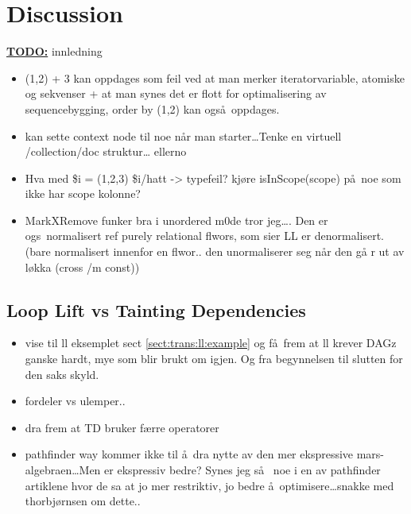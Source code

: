\chapter{Discussion}
\label{chapter:discussion}

\textbf{\underline{\LARGE TODO:}} innledning

\begin{itemize}
  \item (1,2) + 3 kan oppdages som feil ved at man merker iteratorvariable, atomiske og sekvenser + at man synes
  det er flott for optimalisering av sequencebygging, order by (1,2) kan ogs\aa~oppdages.
  \item kan sette context node til noe n\aa r man starter\ldots Tenke en virtuell /collection/doc struktur\ldots
  ellerno
	\item Hva med \$i = (1,2,3) \$i/hatt -> typefeil? kj\o re isInScope(scope) p\aa~noe som ikke har scope kolonne?
	\item MarkXRemove funker bra i unordered m0de tror jeg\ldots. Den er ogs\a~normalisert ref purely relational
	flwors, som sier LL er denormalisert. (bare normalisert innenfor en flwor.. den unormaliserer seg n\aa r den g\aa
	r ut av l\o kka (cross /m const))
\end{itemize}

\section{Loop Lift vs Tainting Dependencies}
\label{sect:disc:llvsmXr}
\begin{itemize}
  \item vise til ll eksemplet sect \ref{sect:trans:ll:example} og f\aa~frem at ll krever DAGz ganske hardt,
  mye som blir brukt om igjen. Og fra begynnelsen til slutten for den saks skyld.
  \item fordeler vs ulemper..
  \item dra frem at TD bruker f\ae rre operatorer
  \item pathfinder way kommer ikke til \aa~dra nytte av den mer ekspressive mars-algebraen\ldots Men er ekspressiv
	  bedre? Synes jeg s\aa~ noe i en av pathfinder artiklene hvor de sa at jo mer restriktiv, jo bedre
	  \aa~optimisere\ldots snakke med thorbj\o rnsen om dette..
\end{itemize}

